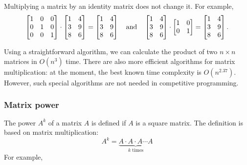 \begin{samepage}
Multiplying a matrix by an identity matrix
does not change it. For example,
\[
 \begin{bmatrix}
  1 & 0 & 0 \\
  0 & 1 & 0 \\
  0 & 0 & 1 \\
 \end{bmatrix}
\cdot
 \begin{bmatrix}
  1 & 4 \\
  3 & 9 \\
  8 & 6 \\
 \end{bmatrix}
=
 \begin{bmatrix}
  1 & 4 \\
  3 & 9 \\
  8 & 6 \\
 \end{bmatrix} \hspace{10px} \textrm{and} \hspace{10px}
 \begin{bmatrix}
  1 & 4 \\
  3 & 9 \\
  8 & 6 \\
 \end{bmatrix}
\cdot
 \begin{bmatrix}
  1 & 0 \\
  0 & 1 \\
 \end{bmatrix}
=
 \begin{bmatrix}
  1 & 4 \\
  3 & 9 \\
  8 & 6 \\
 \end{bmatrix}.
\]
\end{samepage}

Using a straightforward algorithm,
we can calculate the product of
two $n \times n$ matrices
in $O(n^3)$ time.
There are also more efficient algorithms
for matrix multiplication:
at the moment, the best known time complexity
is $O(n^{2.37})$.
However, such special algorithms are not needed
in competitive programming.

\subsubsection{Matrix power}


The power $A^k$ of a matrix $A$ is defined
if $A$ is a square matrix.
The definition is based on matrix multiplication:
\[ A^k = \underbrace{A \cdot A \cdot A \cdots A}_{\textrm{$k$ times}} \]
For example,

